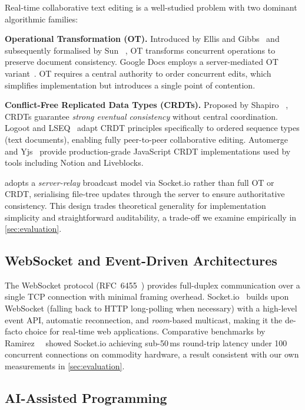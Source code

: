 Real-time collaborative text editing is a well-studied problem with two
dominant algorithmic families:

\textbf{Operational Transformation (OT).}
Introduced by Ellis and Gibbs~\cite{ellis1989concurrency} and subsequently
formalised by Sun \etal~\cite{sun1998operational}, OT transforms concurrent
operations to preserve document consistency. Google Docs employs a
server-mediated OT variant~\cite{googledocs2010}. OT requires a central
authority to order concurrent edits, which simplifies implementation but
introduces a single point of contention.

\textbf{Conflict-Free Replicated Data Types (CRDTs).}
Proposed by Shapiro \etal~\cite{shapiro2011conflict}, CRDTs guarantee
\emph{strong eventual consistency} without central coordination. Logoot
\cite{weiss2009logoot} and LSEQ~\cite{nedelec2013lseq} adapt CRDT principles
specifically to ordered sequence types (text documents), enabling fully
peer-to-peer collaborative editing. Automerge~\cite{kleppmann2019local} and
Yjs~\cite{nicolaescu2015yjs} provide production-grade JavaScript CRDT
implementations used by tools including Notion and Liveblocks.

\echoray{} adopts a \emph{server-relay} broadcast model via Socket.io rather
than full OT or CRDT, serialising file-tree updates through the server to
ensure authoritative consistency. This design trades theoretical generality
for implementation simplicity and straightforward auditability, a trade-off we
examine empirically in \cref{sec:evaluation}.

\subsection{WebSocket and Event-Driven Architectures}

The WebSocket protocol (RFC~6455~\cite{rfc6455}) provides full-duplex
communication over a single TCP connection with minimal framing overhead.
Socket.io~\cite{socketio2024} builds upon WebSocket (falling back to HTTP
long-polling when necessary) with a high-level event API, automatic
reconnection, and \emph{room}-based multicast, making it the de-facto choice
for real-time web applications. Comparative benchmarks by
Ramirez~\etal~\cite{ramirez2023benchmark} showed Socket.io achieving
sub-50\,ms round-trip latency under 100 concurrent connections on commodity
hardware, a result consistent with our own measurements in \cref{sec:evaluation}.

\subsection{AI-Assisted Programming}

